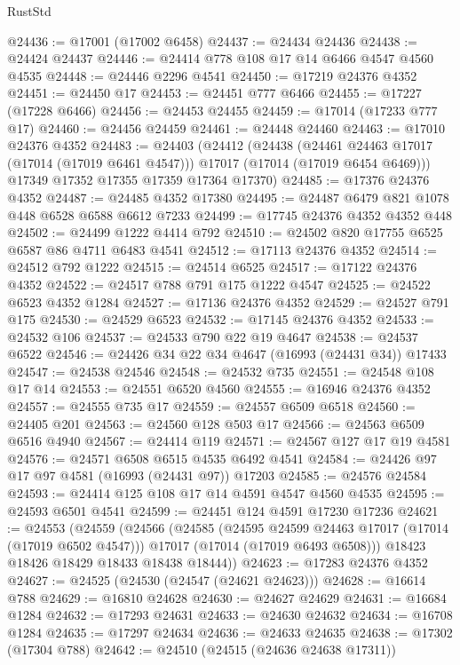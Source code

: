 \begin{lexlean}{RustStd}
\begin{coremodule}
{\begin{coremodule}
{{{{{{{{{{{{{{{{{{{{{{{{{{{{{{{{{{{{{{{{{{{{{{{{{{{{{{{@24436 := @17001 (@17002 @6458)
@24437 := @24434 @24436
@24438 := @24424 @24437
@24446 := @24414 @778 @108 @17 @14 @6466 @4547 @4560 @4535
@24448 := @24446 @2296 @4541
@24450 := @17219 @24376 @4352
@24451 := @24450 @17
@24453 := @24451 @777 @6466
@24455 := @17227 (@17228 @6466)
@24456 := @24453 @24455
@24459 := @17014 (@17233 @777 @17)
@24460 := @24456 @24459
@24461 := @24448 @24460
@24463 := @17010 @24376 @4352
@24483 := @24403
    (@24412
      (@24438
        (@24461 @24463 @17017 (@17014 (@17019 @6461 @4547)))
        @17017
        (@17014 (@17019 @6454 @6469)))
      @17349
      @17352
      @17355
      @17359
      @17364
      @17370)
@24485 := @17376 @24376 @4352
@24487 := @24485 @4352 @17380
@24495 := @24487 @6479 @821 @1078 @448 @6528 @6588 @6612 @7233
@24499 := @17745 @24376 @4352 @4352 @448
@24502 := @24499 @1222 @4414 @792
@24510 := @24502 @820 @17755 @6525 @6587 @86 @4711 @6483 @4541
@24512 := @17113 @24376 @4352
@24514 := @24512 @792 @1222
@24515 := @24514 @6525
@24517 := @17122 @24376 @4352
@24522 := @24517 @788 @791 @175 @1222 @4547
@24525 := @24522 @6523 @4352 @1284
@24527 := @17136 @24376 @4352
@24529 := @24527 @791 @175
@24530 := @24529 @6523
@24532 := @17145 @24376 @4352
@24533 := @24532 @106
@24537 := @24533 @790 @22 @19 @4647
@24538 := @24537 @6522
@24546 := @24426 @34 @22 @34 @4647 (@16993 (@24431 @34)) @17433
@24547 := @24538 @24546
@24548 := @24532 @735
@24551 := @24548 @108 @17 @14
@24553 := @24551 @6520 @4560
@24555 := @16946 @24376 @4352
@24557 := @24555 @735 @17
@24559 := @24557 @6509 @6518
@24560 := @24405 @201
@24563 := @24560 @128 @503 @17
@24566 := @24563 @6509 @6516 @4940
@24567 := @24414 @119
@24571 := @24567 @127 @17 @19 @4581
@24576 := @24571 @6508 @6515 @4535 @6492 @4541
@24584 := @24426 @97 @17 @97 @4581 (@16993 (@24431 @97)) @17203
@24585 := @24576 @24584
@24593 := @24414 @125 @108 @17 @14 @4591 @4547 @4560 @4535
@24595 := @24593 @6501 @4541
@24599 := @24451 @124 @4591 @17230 @17236
@24621 := @24553
    (@24559
      (@24566
        (@24585
          (@24595 @24599 @24463 @17017 (@17014 (@17019 @6502 @4547)))
          @17017
          (@17014 (@17019 @6493 @6508)))
        @18423
        @18426
        @18429
        @18433
        @18438
        @18444))
@24623 := @17283 @24376 @4352
@24627 := @24525 (@24530 (@24547 (@24621 @24623)))
@24628 := @16614 @788
@24629 := @16810 @24628
@24630 := @24627 @24629
@24631 := @16684 @1284
@24632 := @17293 @24631
@24633 := @24630 @24632
@24634 := @16708 @1284
@24635 := @17297 @24634
@24636 := @24633 @24635
@24638 := @17302 (@17304 @788)
@24642 := @24510 (@24515 (@24636 @24638 @17311))
}}}}}}}}}}}}}}}}}}}}}}}}}}}}}}}}}}}}}}}}}}}}}}}}}}}}}}}
\end{coremodule}}
\end{coremodule}
\end{lexlean}
